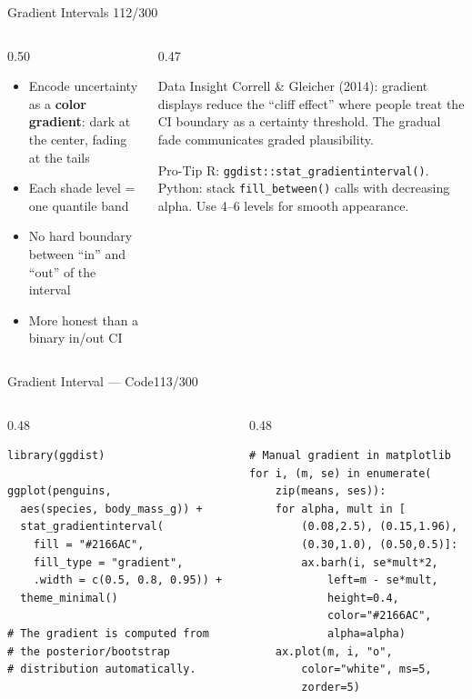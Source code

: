 \documentclass[10pt]{beamer}
\newcommand{\smark}[1]{\hfill{\scriptsize\color{codegray}#1}}
\begin{document}
\begin{frame}{Gradient Intervals}
\smark{112/300}
\begin{columns}[T]
\begin{column}{0.50\textwidth}
\begin{itemize}
    \item Encode uncertainty as a \textbf{color gradient}: dark at the center, fading at the tails
    \item Each shade level = one quantile band
    \item No hard boundary between ``in'' and ``out'' of the interval
    \item More honest than a binary in/out CI
\end{itemize}
\end{column}
\begin{column}{0.47\textwidth}
\begin{exampleblock}{Data Insight}
    \scriptsize Correll \& Gleicher (2014): gradient displays reduce the ``cliff effect'' where people treat the CI boundary as a certainty threshold. The gradual fade communicates graded plausibility.
\end{exampleblock}
\vspace{0.1cm}
\begin{alertblock}{Pro-Tip}
    \scriptsize R: \texttt{ggdist::stat\_gradientinterval()}. Python: stack \texttt{fill\_between()} calls with decreasing alpha. Use 4--6 levels for smooth appearance.
\end{alertblock}
\end{column}
\end{columns}
\end{frame}

\begin{frame}[fragile]{Gradient Interval --- Code}\smark{113/300}
\begin{columns}[T]
\begin{column}{0.48\textwidth}
\begin{lstlisting}[style=Rstyle]
library(ggdist)

ggplot(penguins,
  aes(species, body_mass_g)) +
  stat_gradientinterval(
    fill = "#2166AC",
    fill_type = "gradient",
    .width = c(0.5, 0.8, 0.95)) +
  theme_minimal()

# The gradient is computed from
# the posterior/bootstrap
# distribution automatically.
\end{lstlisting}
\end{column}
\begin{column}{0.48\textwidth}
\begin{lstlisting}[style=Pystyle]
# Manual gradient in matplotlib
for i, (m, se) in enumerate(
    zip(means, ses)):
    for alpha, mult in [
        (0.08,2.5), (0.15,1.96),
        (0.30,1.0), (0.50,0.5)]:
        ax.barh(i, se*mult*2,
            left=m - se*mult,
            height=0.4,
            color="#2166AC",
            alpha=alpha)
    ax.plot(m, i, "o",
        color="white", ms=5,
        zorder=5)
\end{lstlisting}
\end{column}
\end{columns}
\end{frame}
\end{document}
